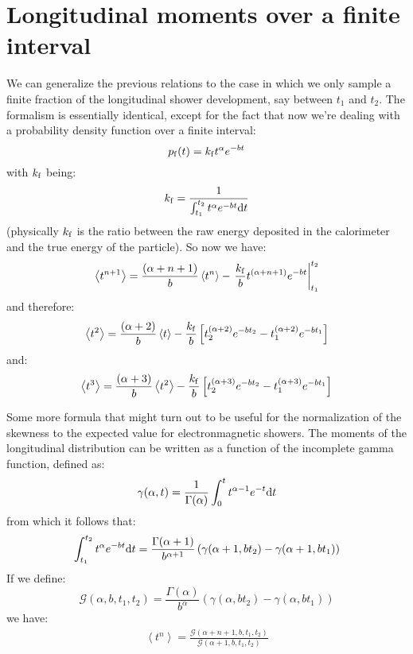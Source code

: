 \documentclass[a4paper,11pt]{article}
\newcommand{\diff}{{\rm d}}
\begin{document}
\section{Longitudinal moments over a finite interval}

We can generalize the previous relations to the case in which we only
sample a finite fraction of the longitudinal shower development,
say between $t_1$ and $t_2$. The formalism is essentially identical, except
for the fact that now we're dealing with a probability density function
over a finite interval:
$$
p_{\rm f}(t) = k_{\rm f} t^\alpha e^{-bt}
$$
with $k_{\rm f}$ being:
$$
k_{\rm f} = \frac{1}{\int_{t_1}^{t_2} t^\alpha e^{-bt} \diff t}
$$
(physically $k_{\rm f}$ is the ratio between the raw energy deposited in the
calorimeter and the true energy of the particle). So now we have:
\begin{equation}
\left< t^{n+1} \right> = \frac{(\alpha + n + 1)}{b}\left< t^n \right> -
\left.\frac{k_{\rm f}}{b} t^{(\alpha + n + 1)} e^{-bt}\right|_{t_1}^{t_2}
\end{equation}
and therefore:
\begin{equation}
\left< t^2 \right> = \frac{(\alpha + 2)}{b}\left< t \right> -
\frac{k_{\rm f}}{b}
\left[t_2^{(\alpha + 2)} e^{-bt_2} - t_1^{(\alpha + 2)} e^{-bt_1}\right]
\end{equation}
and:
\begin{equation}
\left< t^3 \right> = \frac{(\alpha + 3)}{b}\left< t^2 \right> -
\frac{k_{\rm f}}{b}
\left[t_2^{(\alpha + 3)} e^{-bt_2} - t_1^{(\alpha + 3)} e^{-bt_1}\right]
\end{equation}

Some more formula that might turn out to be useful for the normalization
of the skewness to the expected value for electronmagnetic showers.
The moments of the longitudinal distribution can be written as a function
of the incomplete gamma function, defined as:
\begin{equation}
\gamma(\alpha, t) = \frac{1}{\Gamma(\alpha)}
\int_{0}^{t} t^{\alpha - 1} e^{-t} \diff t
\end{equation}
from which it follows that:
\begin{equation}
\int_{t_1}^{t_2} t^{\alpha} e^{-bt} \diff t =
\frac{\Gamma(\alpha+1)}{b^{\alpha+1}}
\left( \gamma(\alpha+1, bt_2) - \gamma(\alpha+1, bt_1) \right)
\end{equation}
If we define:
$$
{\mathcal G}(\alpha, b, t_1, t_2) = \frac{\Gamma(\alpha)}{b^{\alpha}}
\left( \gamma(\alpha, bt_2) - \gamma(\alpha, bt_1) \right)
$$
we have:
\begin{align}
\left< t^n \right> =
\frac{{\mathcal G}(\alpha + n + 1, b, t_1, t_2)}
     {{\mathcal G}(\alpha + 1, b, t_1, t_2)}
\end{align}
\end{document}
